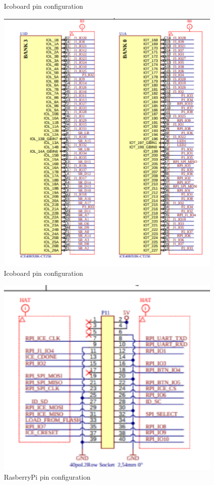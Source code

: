 \documentclass[journal,12pt,twocolumn]{IEEEtran}
\begin{document}
\begin{itemize}
\begin{figure}[!h]
\caption{Icoboard pin configuration}
\label{fig:arduino}
\end{figure}
\begin{figure}[!h]
\centering
\includegraphics[scale=0.5]{./tabel/icoboard1.eps}
\caption{Icoboard pin configuration}
\label{fig:arduino}
\end{figure}
\begin{figure}[!h]
\centering
\includegraphics[scale=0.8]{./tabel/raspberry.eps}
\caption{RasberryPi pin configuration}
\label{fig:arduino}
\end{figure}
\end{itemize}
\end{document}
